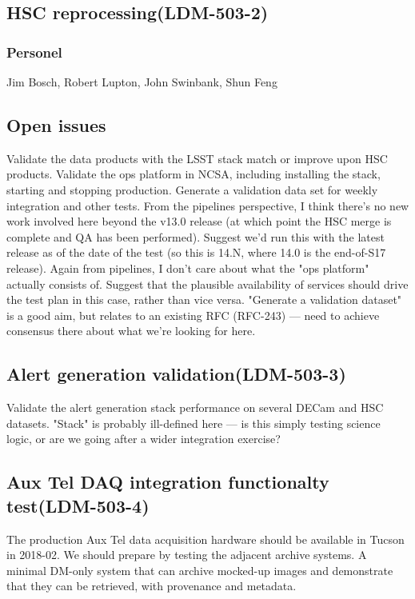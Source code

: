 \subsection{ HSC reprocessing\textbf{(LDM-503-2)}\label{LDM-503-2}}
\subsubsection{Personel}
Jim Bosch, Robert Lupton, John Swinbank, Shun Feng

\subsection{Open issues}
 Validate the data products with the LSST stack match or improve upon HSC products.
 Validate the ops platform in NCSA, including installing the stack, starting and stopping production.
 Generate a validation data set for weekly integration and other tests.
 \newline From the pipelines perspective, I think there's no new work involved here beyond the v13.0 release (at which point the HSC merge is complete and QA has been performed). Suggest we'd run this with the latest release as of the date of the test (so this is 14.N, where 14.0 is the end-of-S17 release).
 Again from pipelines, I don't care about what the "ops platform" actually consists of. Suggest that the plausible availability of services should drive the test plan in this case, rather than vice versa.
 "Generate a validation dataset" is a good aim, but relates to an existing RFC (RFC-243) — need to achieve consensus there about what we're looking for here.



\subsection{ Alert generation validation\textbf{(LDM-503-3)}\label{LDM-503-3}}
 Validate the alert generation stack performance on several DECam and HSC datasets.
 \newline "Stack" is probably ill-defined here — is this simply testing science logic, or are we going after a wider integration exercise?
\subsection{ Aux Tel DAQ integration functionalty test\textbf{(LDM-503-4)}\label{LDM-503-4}}
 The production Aux Tel data acquisition hardware should be available in Tucson in 2018-02. We should prepare by testing the adjacent archive systems.
 \newline A minimal DM-only system that can archive mocked-up images and demonstrate that they can be retrieved, with provenance and metadata.
